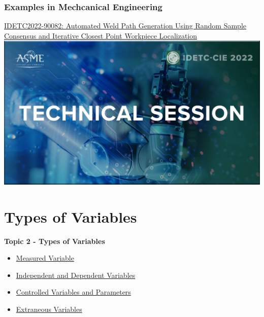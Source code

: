 \documentclass[fleqn]{beamer} %
\newcommand{\sectionIItitle}{Types of Variables}
\newcommand{\sectionIsubsectionIVtitle}{Examples in Mechcanical Engineering}
\newcommand{\sectionIIsubsectionItitle}{Measured Variable}
\newcommand{\sectionIIsubsectionIItitle}{Independent and Dependent Variables}
\newcommand{\sectionIIsubsectionIIItitle}{Controlled Variables and Parameters}
\newcommand{\sectionIIsubsectionIVtitle}{Extraneous Variables}
\begin{document}
			\begin{frame}
				\frametitle{\sectionIsubsectionIVtitle}
				\href{https://events-platform.asmeconferences.org/event/idetc-cie-2022/planning/UGxhbm5pbmdfOTcxNDk4}{IDETC2022-90082: Automated Weld Path Generation Using Random Sample Consensus and Iterative Closest Point Workpiece Localization}\vspace{5mm}\\

				\includegraphics[scale=0.125]{images/IDETC_technical_session.png}

			\end{frame}	


	\section{\sectionIItitle}\label{sectionII}

		\begin{frame}
			\large \textbf{Topic 2 - \sectionIItitle} \vspace{3mm}\\

			\begin{itemize}
				\item \hyperlink{sectionIIsubsectionI}{\sectionIIsubsectionItitle} \vspc %
				\item \hyperlink{sectionIIsubsectionII}{\sectionIIsubsectionIItitle} \vspc %
				\item \hyperlink{sectionIIsubsectionIII}{\sectionIIsubsectionIIItitle} \vspc %
				\item \hyperlink{sectionIIsubsectionIV}{\sectionIIsubsectionIVtitle} \vspc %
			\end{itemize}
		\end{frame}
\end{document}

